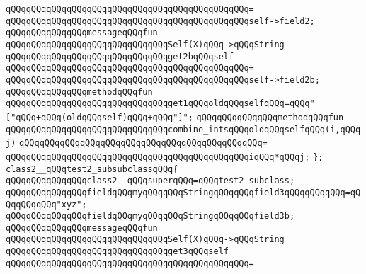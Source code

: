 \verb|qQQqqQQqqQQqqQQqqQQqqQQqqQQqqQQqqQQqqQQqqQQqqQQq=|\newline
\verb|qQQqqQQqqQQqqQQqqQQqqQQqqQQqqQQqqQQqqQQqqQQqqQQqself->field2;|\newline
\newline
\verb|qQQqqQQqqQQqqQQqmessageqQQqfun|\newline
\verb|qQQqqQQqqQQqqQQqqQQqqQQqqQQqqQQqSelf(X)qQQq->qQQqString|\newline
\verb|qQQqqQQqqQQqqQQqqQQqqQQqqQQqqQQqget2bqQQqself|\newline
\verb|qQQqqQQqqQQqqQQqqQQqqQQqqQQqqQQqqQQqqQQqqQQqqQQq=|\newline
\verb|qQQqqQQqqQQqqQQqqQQqqQQqqQQqqQQqqQQqqQQqqQQqqQQqself->field2b;|\newline
\newline
\verb|qQQqqQQqqQQqqQQqmethodqQQqfun|\newline
\verb|qQQqqQQqqQQqqQQqqQQqqQQqqQQqqQQqget1qQQqoldqQQqselfqQQq=qQQq"["qQQq+qQQq(oldqQQqself)qQQq+qQQq"]";|\newline
\newline
\verb|qQQqqQQqqQQqqQQqmethodqQQqfun|\newline
\verb|qQQqqQQqqQQqqQQqqQQqqQQqqQQqqQQqcombine_intsqQQqoldqQQqselfqQQq(i,qQQqj)|\newline
\verb|qQQqqQQqqQQqqQQqqQQqqQQqqQQqqQQqqQQqqQQqqQQqqQQq=|\newline
\verb|qQQqqQQqqQQqqQQqqQQqqQQqqQQqqQQqqQQqqQQqqQQqqQQqiqQQq*qQQqj;|\newline
\verb|};|\newline
\newline
\verb|class2__qQQqtest2_subsubclassqQQq{|\newline
\newline
\verb|qQQqqQQqqQQqqQQqclass2__qQQqsuperqQQq=qQQqtest2_subclass;|\newline
\newline
\verb|qQQqqQQqqQQqqQQqfieldqQQqmyqQQqqQQqStringqQQqqQQqfield3qQQqqQQqqQQq=qQQqqQQqqQQq"xyz";|\newline
\verb|qQQqqQQqqQQqqQQqfieldqQQqmyqQQqqQQqStringqQQqqQQqfield3b;|\newline
\newline
\verb|qQQqqQQqqQQqqQQqmessageqQQqfun|\newline
\verb|qQQqqQQqqQQqqQQqqQQqqQQqqQQqqQQqSelf(X)qQQq->qQQqString|\newline
\verb|qQQqqQQqqQQqqQQqqQQqqQQqqQQqqQQqget3qQQqself|\newline
\verb|qQQqqQQqqQQqqQQqqQQqqQQqqQQqqQQqqQQqqQQqqQQqqQQq=|\newline
